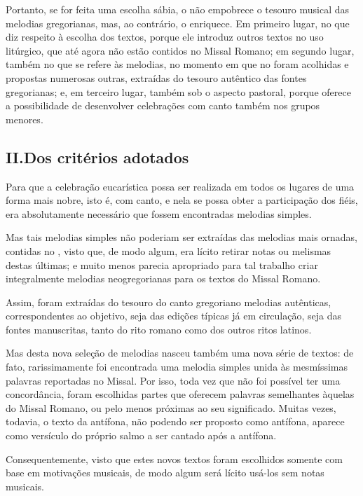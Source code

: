  Portanto, se for feita uma escolha sábia, o {\GS} não empobrece o tesouro musical das melodias gregorianas, mas, ao contrário, o enriquece. Em primeiro lugar, no que diz respeito à escolha dos textos, porque ele introduz outros textos no uso litúrgico, que até agora não estão contidos no Missal Romano; em segundo lugar, também no que se refere às melodias, no momento em que no {\GS} foram acolhidas e propostas numerosas outras, extraídas do tesouro autêntico das fontes gregorianas; e, em terceiro lugar, também sob o aspecto pastoral, porque oferece a possibilidade de desenvolver celebrações com canto também nos grupos menores.

\subsection{II.\@ Dos critérios adotados}\label{subsection:praenotanda-2}

 Para que a celebração eucarística possa ser realizada em todos os lugares de uma forma mais nobre, isto é, com canto, e nela se possa obter a participação dos fiéis, era absolutamente necessário que fossem encontradas melodias simples.

 Mas tais melodias simples não poderiam ser extraídas das melodias mais ornadas, contidas no {\GR}, visto que, de modo algum, era lícito retirar notas ou melismas destas últimas; e muito menos parecia apropriado para tal trabalho criar integralmente melodias neogregorianas para os textos do Missal Romano.

 Assim, foram extraídas do tesouro do canto gregoriano melodias autênticas, correspondentes ao objetivo, seja das edições típicas já em circulação, seja das fontes manuscritas, tanto do rito romano como dos outros ritos latinos.

 Mas desta nova seleção de melodias nasceu também uma nova série de textos: de fato, rarissimamente foi encontrada uma melodia simples unida às mesmíssimas palavras reportadas no Missal. Por isso, toda vez que não foi possível ter uma concordância, foram escolhidas partes que oferecem palavras semelhantes àquelas do Missal Romano, ou pelo menos próximas ao seu significado. Muitas vezes, todavia, o texto da antífona, não podendo ser proposto como antífona, aparece como versículo do próprio salmo a ser cantado após a antífona.

 Consequentemente, visto que estes novos textos foram escolhidos somente com base em motivações musicais, de modo algum será lícito usá-los sem notas musicais.

